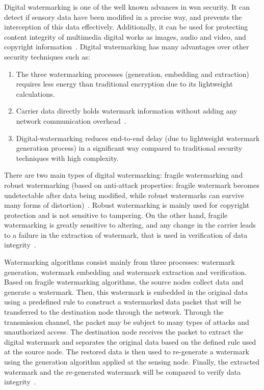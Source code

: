 \documentclass{llncs}
\begin{document}
Digital watermarking is one of the well known advances in \gls*{wsn} security. It can detect if sensory data have been modified in a precise way, and prevents the interception of this data effectively. Additionally, it can be used for protecting content integrity of multimedia digital works as images, audio and video, and copyright information~\cite{van1994}. Digital watermarking has many advantages over other security techniques such as: 
\begin{enumerate}
    \item The three watermarking processes (generation, embedding and extraction) requires less energy than traditional encryption due to its light\-weight calculations.
    \item Carrier data directly holds watermark information without adding any network communication overhead~\cite{fei2006}.
    \item Digital-watermarking reduces end-to-end delay (due to lightweight watermark generation process) in a significant way compared to traditional security techniques with high complexity.
\end{enumerate}
There are two main types of digital watermarking: fragile watermarking and robust watermarking (based on anti-attack properties: fragile watermark becomes undetectable after data being modified, while robust watermarks can survive many forms of distortion)~\cite{cox2007,megias2021}. Robust watermarking is mainly used for copyright protection and is not sensitive to tampering. On the other hand, fragile watermarking is greatly sensitive to altering, and any change in the carrier leads to a failure in the extraction of watermark, that is used in verification of data integrity~\cite{perez2006}. 

Watermarking algorithms consist mainly from three processes: watermark generation, watermark embedding and watermark extraction and verification. Based on fragile watermarking algorithms, the source nodes collect data and generate a watermark. Then, this watermark is embedded in the original data using a predefined rule to construct a watermarked data packet that will be transferred to the destination node through the network. Through the transmission channel, the packet may be subject to many types of attacks and unauthorized access. The destination node receives the packet to extract the digital watermark and separates the original data based on the defined rule used at the source node. The restored data is then used to re-generate a watermark using the generation algorithm applied at the sensing node. Finally, the extracted watermark and the re-generated watermark will be compared to verify data integrity~\cite{Zhang2017}.
\end{document}
